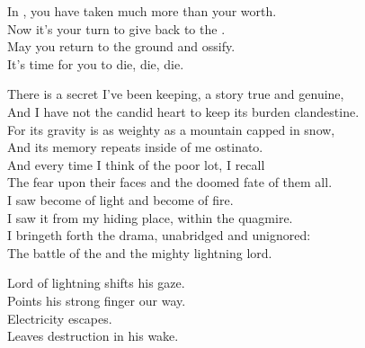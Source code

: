 In , you have taken much more than your worth. \\
Now it's your turn to give back to the . \\

May you return to the ground and ossify. \\
It's time for you to die, die, die. \\









There is a secret I've been keeping, a story true and genuine, \\
And I have not the candid heart to keep its burden clandestine. \\

For its gravity is as weighty as a mountain capped in snow, \\
And its memory repeats inside of me ostinato. \\

And every time I think of the poor lot, I recall \\
The fear upon their faces and the doomed fate of them all. \\

I saw  become of light and  become of fire. \\
I saw it from my hiding place, within the quagmire. \\

I bringeth forth the drama, unabridged and unignored: \\
The battle of the  and the mighty lightning lord. \\





Lord of lightning shifts his gaze. \\
Points his strong finger our way. \\
Electricity escapes. \\
Leaves destruction in his wake. \\

